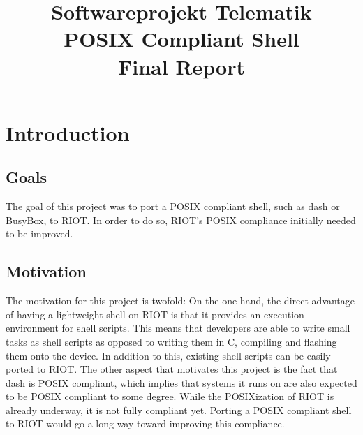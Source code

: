 \documentclass[conference]{IEEEtran}
\begin{document}
\title{Softwareprojekt Telematik\\POSIX Compliant Shell\\Final Report}


\author{
\and
{}
\and
{}
}

\maketitle


\begin{abstract}
\end{abstract}

\section{Introduction}
\label{sec:Introduction}

\subsection{Goals}
\label{sub:Goals}
The goal of this project was to port a POSIX compliant shell, such as
dash\cite{dash} or BusyBox\cite{busybox}, to RIOT. In order to do so,
RIOT's POSIX compliance initially needed to be improved.

\subsection{Motivation}
\label{sub:Motivation}
The motivation for this project is twofold: On the one hand, the direct
advantage of having a lightweight shell on RIOT is that it provides an
execution environment for shell scripts. This means that developers are
able to write small tasks as shell scripts as opposed to writing them in
C, compiling and flashing them onto the device. In addition to this,
existing shell scripts can be easily ported to RIOT. The other aspect
that motivates this project is the fact that dash is POSIX compliant,
which implies that systems it runs on are also expected to be POSIX
compliant to some degree. While the POSIXization of RIOT is already
underway, it is not fully compliant yet. Porting a POSIX compliant shell
to RIOT would go a long way toward improving this compliance.
\end{document}
